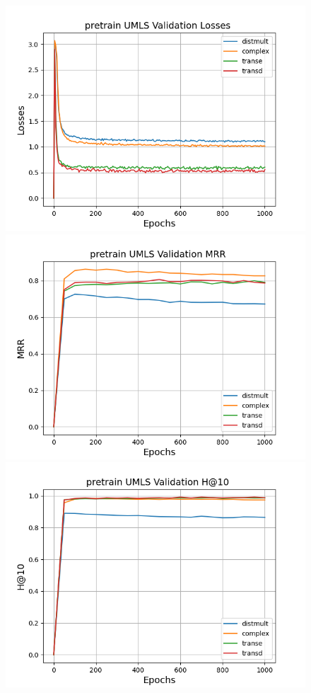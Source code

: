 \begin{figure}
    \centering
    \begin{minipage}{.3\textwidth}
      \centering
      \includegraphics[width=0.9\linewidth]{figures/results/pretrain/umls/pretrain_umls_losses.png}
    \end{minipage}%
    \begin{minipage}{.3\textwidth}
      \centering
      \includegraphics[width=0.9\linewidth]{figures/results/pretrain/umls/pretrain_umls_mrrs.png}
    \end{minipage}
    \begin{minipage}{.3\textwidth}
      \centering
      \includegraphics[width=0.9\linewidth]{figures/results/pretrain/umls/pretrain_umls_hit10s.png}

\end{minipage}
\end{figure}
